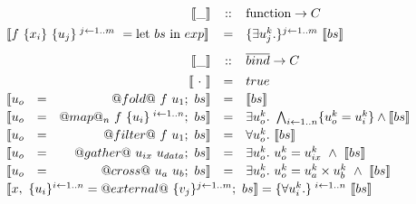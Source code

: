 $$\begin{array}{lcrcl}
&&\constr{\_} & :: & \textrm{function} \rightarrow C
\\[1ex]

\multicolumn{3}{l}{
    \constr{
       f~ \{ x_i \}~ \{ u_j \}^{\; j \gets 1..m}~ 
         =  \textrm{let}~ bs~ \textrm{in}~ exp
    }
}
        & = & \{ \exists u_j^k. \}^{j \gets 1..m}
           ~\constr{bs}

\\[2ex]

&&\constr{\_} & :: & \overline{bind} \rightarrow C 
\\[1ex]

&&\constr{~ \cdot ~}    
        & = &   true                          
\\[0.5ex]

\constr{u_o &=& @fold@~ f~ u_1;~ bs}
        & = &   \constr{bs}
\\[0.5ex]

\constr{u_o &=& @map@_n~ f~ \{u_i\}^{\;i \gets 1..n};~ bs }       
        & = &   \exists u_o^k.\ \bigwedge_{i \gets 1..n}\{u_o^k = u_i^k\} 
                \wedge \constr{bs}
\\[0.5ex]

\constr{u_o &=& @filter@~ f~ u_1;~ bs}
        & = &   \forall u_o^k.\ \constr{bs}
\\[0.5ex]

\constr{u_o &=& @gather@~ u_{ix}~ u_{data};~ bs}
        & = &   \exists u_o^k.\ u_o^k = u_{ix}^k
                ~\wedge~ \constr{bs}
\\[0.5ex]

\constr{u_o &=& @cross@~ u_a~ u_b;~ bs}
        & = &   \exists u_o^k.\ u_o^k = u_a^k \times u_b^k 
                ~\wedge~ \constr{bs}
\\[0.5ex]

\multicolumn{5}{l}{
\constr{x,~ \{u_i\}^{i \gets 1..n} = @external@~ \{v_j\}^{j \gets 1..m};~ bs}
          =     \{ \forall u_i^k. \}^{\; i \gets 1..n}
                ~\constr{bs}
}
\\[0.5ex]
\end{array}$$


